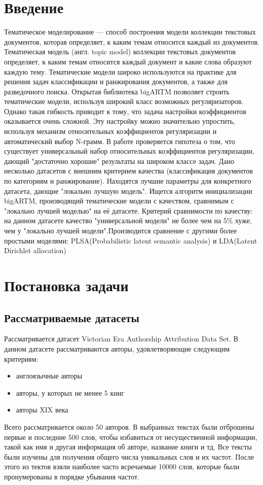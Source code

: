 \documentclass{article}
\begin{document}
\section {Введение}
Тематическое моделирование — способ построения модели коллекции текстовых документов, которая определяет, к каким темам относится каждый из документов\cite{wallach2006topic}. Тематическая модель (англ. topic model) коллекции текстовых документов определяет, к каким темам относится каждый документ и какие слова  образуют каждую тему.
Тематические модели широко используются на практике для решения задач классификации и ранжирования документов, а также для разведочного поиска\cite{janina2016}.  
 Открытая библиотека bigARTM\cite{vorontsov2015bigartm}  позволяет строить тематические модели, используя широкий класс возможных регуляризаторов\cite{vorontsov2013veroyat}.  Однако такая гибкость приводит к тому, что задача настройки коэффициентов оказывается очень сложной. Эту настройку можно значительно упростить, используя механизм относительных коэффициентов регуляризации и автоматический выбор N-грамм. В работе проверяется гипотеза о том, что существует универсальный набор относительных коэффициентов регуляризации, дающий "достаточно хорошие" результаты на широком классе задач. Дано несколько датасетов с внешним критерием качества (классификация документов по категориям и ранжирование). Находятся лучшие параметры для конкретного датасета, дающие "локально лучшую модель". Ищется алгоритм инициализации bigARTM, производящий тематические модели с качеством, сравнимым с "локально лучшей моделью" на её датасете. Критерий сравнимости по качеству: на данном датасете качество "универсальной модели" не более чем на 5\% хуже, чем у "локально лучшей модели".Производится сравнение с другими более простыми моделями: PLSA(Probabilistic latent semantic analysis)\cite{hofmann1999probabilistic} и LDA(Latent Dirichlet allocation)\cite{blei2003latent} 
 
\section {Постановка задачи}
\subsection{Рассматриваемые датасеты}
Рассматривается датасет Victorian Era Authorship Attribution Data Set. В данном датасете рассматриваются авторы, удовлетворяющие следующим критериям: 
\begin{itemize}
\item англоязычные авторы
\item авторы, у которых не менее 5 книг 
\item авторы XIX века
\end{itemize}
Всего рассматривается около 50 авторов. В выбранных текстах были отброшены первые и последние 500 слов, чтобы избавиться от несущественной информации, такой как имя и другая информация об авторе, название книги и тд. Все тексты были изучены для получения общего числа уникальных слов и их частот. После этого из тектов взяли наиболее часто всречаемые 10000 слов, которые были пронумерованы в порядке убывания частот. 
\end{document}
